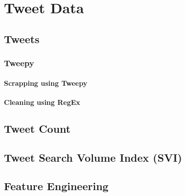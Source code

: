 \chapter{Tweet Data}
\section{Tweets}
\subsection{Tweepy}
\subsubsection{Scrapping using Tweepy}
\subsubsection{Cleaning using RegEx}
\section{Tweet Count}
\section{Tweet Search Volume Index (SVI)}
\section{Feature Engineering}